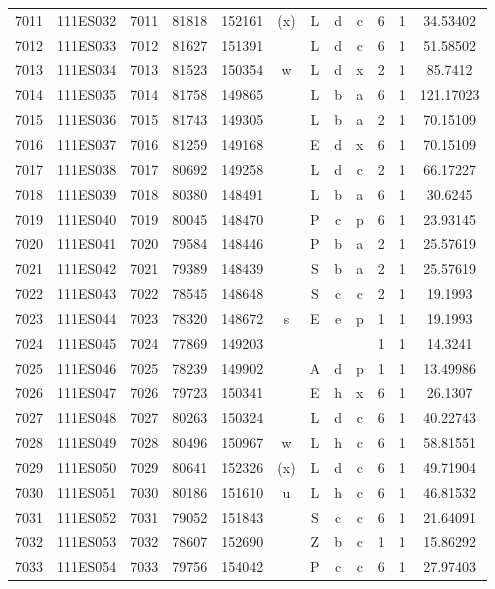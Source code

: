 \begin{tabular}{|*{12}{c|}}
7011 & 111ES032 & 7011 & 81818 & 152161 & (x) & L & d & c & 6 & 1 & 34.53402 \\ 
7012 & 111ES033 & 7012 & 81627 & 151391 &  & L & d & c & 6 & 1 & 51.58502 \\ 
7013 & 111ES034 & 7013 & 81523 & 150354 & w & L & d & x & 2 & 1 & 85.7412 \\ 
7014 & 111ES035 & 7014 & 81758 & 149865 &  & L & b & a & 6 & 1 & 121.17023 \\ 
7015 & 111ES036 & 7015 & 81743 & 149305 &  & L & b & a & 2 & 1 & 70.15109 \\ 
7016 & 111ES037 & 7016 & 81259 & 149168 &  & E & d & x & 6 & 1 & 70.15109 \\ 
7017 & 111ES038 & 7017 & 80692 & 149258 &  & L & d & c & 2 & 1 & 66.17227 \\ 
7018 & 111ES039 & 7018 & 80380 & 148491 &  & L & b & a & 6 & 1 & 30.6245 \\ 
7019 & 111ES040 & 7019 & 80045 & 148470 &  & P & c & p & 6 & 1 & 23.93145 \\ 
7020 & 111ES041 & 7020 & 79584 & 148446 &  & P & b & a & 2 & 1 & 25.57619 \\ 
7021 & 111ES042 & 7021 & 79389 & 148439 &  & S & b & a & 2 & 1 & 25.57619 \\ 
7022 & 111ES043 & 7022 & 78545 & 148648 &  & S & c & c & 2 & 1 & 19.1993 \\ 
7023 & 111ES044 & 7023 & 78320 & 148672 & s & E & e & p & 1 & 1 & 19.1993 \\ 
7024 & 111ES045 & 7024 & 77869 & 149203 &  &  &  &  & 1 & 1 & 14.3241 \\ 
7025 & 111ES046 & 7025 & 78239 & 149902 &  & A & d & p & 1 & 1 & 13.49986 \\ 
7026 & 111ES047 & 7026 & 79723 & 150341 &  & E & h & x & 6 & 1 & 26.1307 \\ 
7027 & 111ES048 & 7027 & 80263 & 150324 &  & L & d & c & 6 & 1 & 40.22743 \\ 
7028 & 111ES049 & 7028 & 80496 & 150967 & w & L & h & c & 6 & 1 & 58.81551 \\ 
7029 & 111ES050 & 7029 & 80641 & 152326 & (x) & L & d & c & 6 & 1 & 49.71904 \\ 
7030 & 111ES051 & 7030 & 80186 & 151610 & u & L & h & c & 6 & 1 & 46.81532 \\ 
7031 & 111ES052 & 7031 & 79052 & 151843 &  & S & c & c & 6 & 1 & 21.64091 \\ 
7032 & 111ES053 & 7032 & 78607 & 152690 &  & Z & b & c & 1 & 1 & 15.86292 \\ 
7033 & 111ES054 & 7033 & 79756 & 154042 &  & P & c & c & 6 & 1 & 27.97403 \\ 

\end{tabular}
